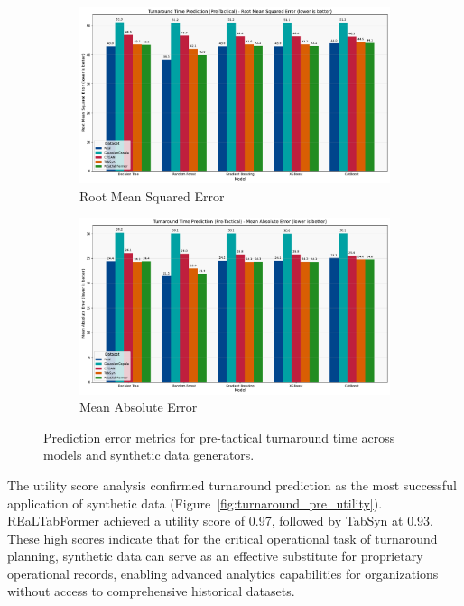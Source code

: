 \documentclass[conference]{IEEEtran}
\begin{document}
\begin{figure}[htbp]
    \centering
    \begin{subfigure}[b]{0.49\textwidth}
        \includegraphics[width=\linewidth]{plots/turnaround_min_pre-tactical/turnaround_min_pre-tactical_rmse.pdf}
        \caption{Root Mean Squared Error}
        \label{fig:turnaround_pre_rmse}
    \end{subfigure}
    \hfill
    \begin{subfigure}[b]{0.49\textwidth}
        \includegraphics[width=\linewidth]{plots/turnaround_min_pre-tactical/turnaround_min_pre-tactical_mae.pdf}
        \caption{Mean Absolute Error}
        \label{fig:turnaround_pre_mae}
    \end{subfigure}
    \caption{Prediction error metrics for pre-tactical turnaround time across models and synthetic data generators.}
\end{figure}

The utility score analysis confirmed turnaround prediction as the most successful application of synthetic data (Figure~\ref{fig:turnaround_pre_utility}). REaLTabFormer achieved a utility score of 0.97, followed by TabSyn at 0.93. These high scores indicate that for the critical operational task of turnaround planning, synthetic data can serve as an effective substitute for proprietary operational records, enabling advanced analytics capabilities for organizations without access to comprehensive historical datasets.
\end{document}
